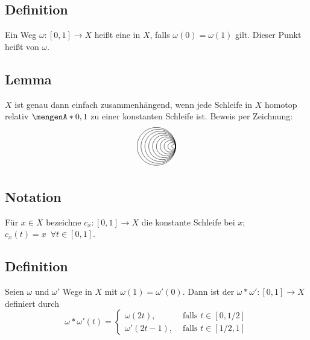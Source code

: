 \subsection[Definition: Schleife]{Definition} %
\label{sub:94}
Ein Weg $\omega : [0,1] \to X$ heißt eine  in $X$, falls $\omega(0)= \omega(1)$ gilt. Dieser Punkt heißt  von $\omega$. 

\subsection[Lemma: Charakterisierung von einfach zusammenhängend über Schleifen]{Lemma} %
\label{sub:95}
$X$ ist genau dann einfach zusammenhängend, wenn jede Schleife in $X$ homotop relativ $\set{0,1}$ zu einer konstanten Schleife ist.
Beweis per Zeichnung:
\[
	\begin{tikzpicture}[scale=0.8]
		\foreach \r in {0.1, 0.2,...,1}{
			\draw (0,0) arc (0:360:\r); 
		}
	\end{tikzpicture}
\]

\subsection[Notation: Konstante Schleife $c_x$]{Notation} %
\label{sub:96}
Für $x \in X$ bezeichne $c_x : [0,1] \to X$ die konstante Schleife bei $x$; $c_x(t)= x \enspace \forall t \in [0,1]$.

\subsection[Definition: Kompositionsweg]{Definition} %
\label{sub:97}
Seien $\omega$ und $\omega'$ Wege in $X$ mit $\omega(1)= \omega'(0)$. Dann ist der  $\omega * \omega' : [0,1] \to X$ definiert durch 
\[
	\omega * \omega' (t) = \begin{cases}
		\omega(2 t), &\text{ falls }t \in [0, 1/2]\\
		\omega'(2t -1), &\text{ falls } t \in [1/2,1]
	\end{cases}
\] 
